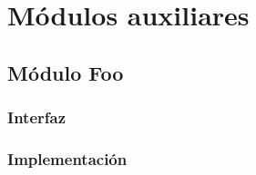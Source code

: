 \section{Módulos auxiliares}
\subsection{Módulo Foo}
\subsubsection{Interfaz}
\subsubsection{Implementación}

